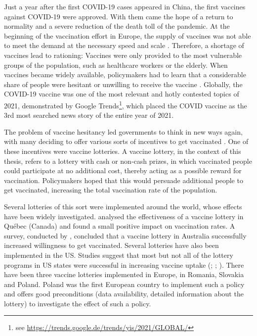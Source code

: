 \documentclass{scrbook}
\begin{document}
Just a year after the first COVID-19 cases appeared in China, the first
vaccines against COVID-19 were approved. With them came the hope of a
return to normality and a severe reduction of the death toll of the
pandemic. At the beginning of the vaccination effort in Europe, the
supply of vaccines was not able to meet the demand at the necessary
speed and scale \parencite{bongardt_europes_2021}. Therefore, a shortage
of vaccines lead to rationing: Vaccines were only provided to the most
vulnerable groups of the population, such as healthcare workers or the
elderly. When vaccines became widely available, policymakers had to
learn that a considerable share of people were hesitant or unwilling to
receive the vaccine \parencite{steinert_covid-19_2022}. Globally, the
COVID-19 vaccine was one of the most relevant and hotly contested topics
of 2021, demonstrated by Google
Trends\footnote{see \url{https://trends.google.de/trends/yis/2021/GLOBAL/}},
which placed the COVID vaccine as the 3rd most searched news story of
the entire year of 2021.

The problem of vaccine hesitancy led governments to think in new ways
again, with many deciding to offer various sorts of incentives to get
vaccinated \parencite{wyllie_jewellery_2023}. One of these incentives
were vaccine lotteries. A vaccine lottery, in the context of this
thesis, refers to a lottery with cash or non-cash prizes, in which
vaccinated people could participate at no additional cost, thereby
acting as a possible reward for vaccination. Policymakers hoped that
this would persuade additional people to get vaccinated, increasing the
total vaccination rate of the population.

Several lotteries of this sort were implemented around the world, whose
effects have been widely investigated. \textcite{dube_exploring_2022}
analysed the effectiveness of a vaccine lottery in Québec (Canada) and
found a small positive impact on vaccination rates. A survey, conducted
by \textcite{jun_association_2022}, concluded that a vaccine lottery in
Australia successfully increased willingness to get vaccinated. Several
lotteries have also been implemented in the US. Studies suggest that
most but not all of the lottery programs in US states were successful in
increasing vaccine uptake (\cite{robertson_are_2021};
\cite{acharya_implementation_2021}; \cite{fuller_assessing_2022}). There
have been three vaccine lotteries implemented in Europe, in Romania,
Slovakia and Poland. Poland was the first European country to implement
such a policy and offers good preconditions (data availability, detailed
information about the lottery) to investigate the effect of such a
policy.
\end{document}
